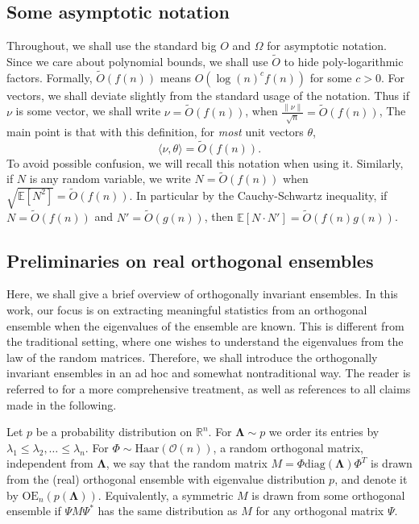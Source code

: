 \documentclass[reqno]{amsart}
\numberwithin{equation}{section}
\newcommand\E{\mathbb{E}}
\newcommand\R{\mathbb{R}}
\begin{document}
\subsection{Some asymptotic notation}
Throughout, we shall use the standard big $O$ and $\Omega$ for asymptotic notation. Since we care about polynomial bounds, we shall use $\tilde{O}$ to hide poly-logarithmic factors. Formally, $\tilde{O}(f(n))$ means $O(\log(n)^cf(n))$ for some $c>0$.
For vectors, we shall deviate slightly from the standard usage of the notation. Thus if $\nu$ is some vector, we shall write $\nu = \tilde{O}(f(n))$, when $\frac{\|\nu\|}{\sqrt{n}} =  \tilde{O}(f(n))$, The main point is that with this definition, for \emph{most} unit vectors $\theta$,
\begin{equation} \label{eq:asynot}
    \langle \nu,\theta\rangle = \tilde{O}(f(n)).
\end{equation}
To avoid possible confusion, we will recall this notation when using it.
Similarly, if $N$ is any random variable, we write $N = \tilde{O}(f(n))$ when $\sqrt{\E[N^2]} = \tilde{O}(f(n))$. In particular by the Cauchy-Schwartz inequality, if $N = \tilde{O}(f(n))$ and $N' = \tilde{O}(g(n))$, then $\E[N\cdot N']  = \tilde{O}(f(n)g(n))$.



\subsection{Preliminaries on real orthogonal ensembles} \label{sec:ortho}
Here, we shall give a brief overview of orthogonally invariant ensembles. In this work, our focus is on extracting meaningful statistics from an orthogonal ensemble when the eigenvalues of the ensemble are known. This is different from the traditional setting, where one wishes to understand the eigenvalues from the law of the random matrices. Therefore, we shall introduce the orthogonally invariant ensembles in an ad hoc and somewhat nontraditional way. The reader is referred to \cite{deift2009orthogonal} for a more comprehensive treatment, as well as references to all claims made in the following.

Let $p$ be a probability distribution on $\R^n$. For $\bm{\Lambda}\sim p$ we order its entries by $\lambda_1\leq\lambda_2,\dots\leq \lambda_n$. For $\Phi \sim \mathrm{Haar}(\mathcal{O}(n))$, a random orthogonal matrix, independent from $\bm{\Lambda}$, we say that the random matrix $M = \Phi\mathrm{diag}(\bm{\Lambda})\Phi^T$ is drawn from the (real) orthogonal ensemble with eigenvalue distribution $p$, and denote it by $\mathrm{OE}_n(p(\bm{\Lambda}))$. Equivalently, a symmetric $M$ is drawn from some orthogonal ensemble if $\Psi M \Psi^*$ has the same distribution as $M$ for any orthogonal matrix $\Psi$. 
\end{document}
